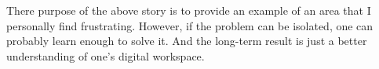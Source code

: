 \documentclass[12pt, oneside]{memoir}
\begin{document}
There purpose of the above story is to provide an example of an area that I personally find frustrating. However, if the problem can be isolated, one can probably learn enough to solve it. And the long-term result is just a better understanding of one's digital workspace.

\begin{verbatim}

\end{verbatim}




\end{document}
